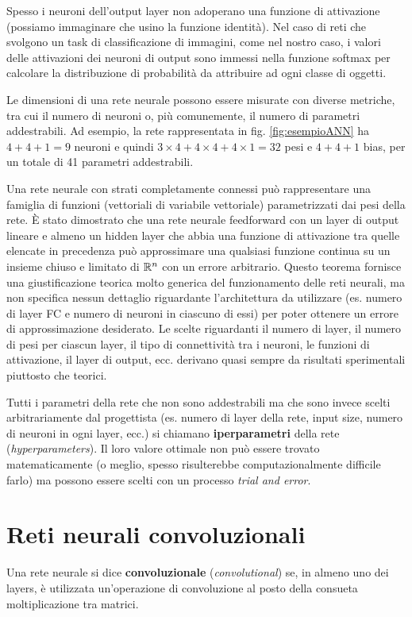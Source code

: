 Spesso i neuroni dell'output layer non adoperano una funzione di attivazione (possiamo immaginare che usino la funzione identità). Nel caso di reti che svolgono un task di classificazione di immagini, come nel nostro caso, i valori delle attivazioni dei neuroni di output sono immessi nella funzione softmax per calcolare la distribuzione di probabilità da attribuire ad ogni classe di oggetti.

Le dimensioni di una rete neurale possono essere misurate con diverse metriche, tra cui il numero di neuroni o, più comunemente, il numero di parametri addestrabili. Ad esempio, la rete rappresentata in fig. \ref{fig:esempioANN} ha $4+4+1=9$ neuroni e quindi $3\times 4 + 4\times 4 + 4\times 1 = 32$ pesi e $4+4+1$ bias, per un totale di 41 parametri addestrabili.

Una rete neurale con strati completamente connessi può rappresentare una famiglia di funzioni (vettoriali di variabile vettoriale) parametrizzati dai pesi della rete.
È stato dimostrato \cite{approximation} che una rete neurale feedforward con un layer di output lineare e
almeno un hidden layer che abbia una funzione di attivazione tra quelle elencate in
precedenza può approssimare una qualsiasi funzione continua su un insieme chiuso e limitato di
$\mathbb{R}^{n}$ con un errore arbitrario.
Questo teorema fornisce una giustificazione teorica molto generica del funzionamento
delle reti neurali, ma non specifica nessun dettaglio riguardante l’architettura da utilizzare (es. numero di layer FC e numero di neuroni in ciascuno di essi)
per poter ottenere un errore di approssimazione desiderato. Le scelte riguardanti il
numero di layer, il numero di pesi per ciascun layer, il tipo di connettività tra i neuroni,
le funzioni di attivazione, il layer di output, ecc. derivano quasi sempre da risultati
sperimentali piuttosto che teorici.

Tutti i parametri della rete che non sono addestrabili ma che sono invece scelti arbitrariamente dal progettista (es. numero di layer della rete, input size, numero di neuroni in ogni layer, ecc.) si chiamano \textbf{iperparametri} della rete (\textit{hyperparameters}). Il loro valore ottimale non può essere trovato matematicamente (o meglio, spesso risulterebbe computazionalmente difficile farlo) ma possono essere scelti con un processo \textit{trial and error}.

\section{Reti neurali convoluzionali}
\label{CNN}
Una rete neurale si dice \textbf{convoluzionale} (\textit{convolutional}) se, in almeno uno dei layers, è utilizzata un'operazione di convoluzione al posto della consueta moltiplicazione tra matrici.

